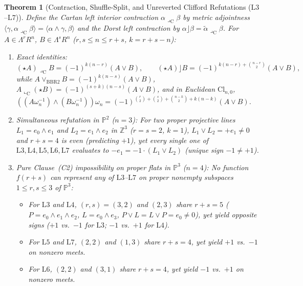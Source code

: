 \documentclass[11pt]{article}
\newtheorem{theorem}{Theorem}[section]
\theoremstyle{definition}
\newcommand{\Cl}{\mathrm{Cl}}
\newcommand{\Proj}{\mathbb{P}}
\newcommand{\Z}{\mathbb{Z}}
\begin{document}
\begin{theorem}[Contraction, Shuffle-Split, and Unreverted Clifford Refutations ($\mathrm{L3}$--$\mathrm{L7}$)]\label{thm:L3-L7}
Define the Cartan left interior contraction $\alpha \mathbin{\lrcorner_{\mathrm{C}}} \beta$ by metric adjointness $\langle \gamma, \alpha \mathbin{\lrcorner_{\mathrm{C}}} \beta \rangle = \langle \alpha \wedge \gamma, \beta \rangle$ and the Dorst left contraction by $\alpha \rfloor \beta = \widetilde{\alpha} \mathbin{\lrcorner_{\mathrm{C}}} \beta$. For $A \in \Lambda^r R^n$, $B \in \Lambda^s R^n$ ($r, s \le n \le r + s$, $k = r + s - n$):
\begin{enumerate}
\item \emph{Exact identities:}
\[
(\star A) \mathbin{\lrcorner_{\mathrm{C}}} B = (-1)^{k(n-r)} (A \vee B), \qquad
(\star A) \rfloor B = (-1)^{k(n-r) + \binom{n-r}{2}} (A \vee B),
\]
while $A \vee_{\mathrm{BBR2}} B = (-1)^{k(n-s)} (A \vee B)$, $A \mathbin{\llcorner_{\mathrm{C}}} (\star B) = (-1)^{(s+k)(n-s)} (A \vee B)$, and in Euclidean $\Cl_{n,0}$, $((A\omega_n^{-1}) \wedge (B\omega_n^{-1}))\omega_n = (-1)^{\binom{r}{2}+\binom{s}{2}+\binom{n-k}{2}+k(n-k)} (A \vee B)$.
\item \emph{Simultaneous refutation in $\Proj^2$ ($n = 3$):} For two proper projective lines $L_1 = e_0 \wedge e_1$ and $L_2 = e_1 \wedge e_2$ in $\Z^3$ ($r = s = 2$, $k = 1$), $L_1 \vee L_2 = +e_1 \neq 0$ and $r + s = 4$ is even (predicting $+1$), yet \emph{every single one} of $\mathrm{L3}, \mathrm{L4}, \mathrm{L5}, \mathrm{L6}, \mathrm{L7}$ evaluates to $-e_1 = -1 \cdot (L_1 \vee L_2)$ (unique sign $-1 \neq +1$).
\item \emph{Pure Clause~(C2) impossibility on proper flats in $\Proj^3$ ($n = 4$):} No function $f(r + s)$ can represent any of $\mathrm{L3}$--$\mathrm{L7}$ on proper nonempty subspaces $1 \le r, s \le 3$ of $\Proj^3$:
\begin{itemize}
\item For $\mathrm{L3}$ and $\mathrm{L4}$, $(r, s) = (3, 2)$ and $(2, 3)$ share $r + s = 5$ ($P = e_0 \wedge e_1 \wedge e_2$, $L = e_0 \wedge e_3$, $P \vee L = L \vee P = e_0 \neq 0$), yet yield opposite signs ($+1$ vs.\ $-1$ for $\mathrm{L3}$; $-1$ vs.\ $+1$ for $\mathrm{L4}$).
\item For $\mathrm{L5}$ and $\mathrm{L7}$, $(2, 2)$ and $(1, 3)$ share $r + s = 4$, yet yield $+1$ vs.\ $-1$ on nonzero meets.
\item For $\mathrm{L6}$, $(2, 2)$ and $(3, 1)$ share $r + s = 4$, yet yield $-1$ vs.\ $+1$ on nonzero meets.
\end{itemize}
\end{enumerate}
\end{theorem}
\end{document}
